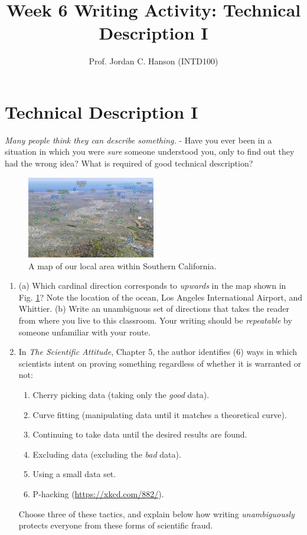\documentclass{article}
\begin{document}
\title{Week 6 Writing Activity: Technical Description I}
\author{Prof. Jordan C. Hanson (INTD100)}

\maketitle

\section{Technical Description I}

\textit{Many people think they can describe something.} - Have you ever been in a situation in which you were \textit{sure} someone understood you, only to find out they had the wrong idea?  What is required of good technical description?
\begin{figure}[ht]
\centering
\includegraphics[width=0.5\textwidth]{map.png}
\caption{\label{fig:1} A map of our local area within Southern California.}
\end{figure}

\begin{enumerate}
\item (a) Which cardinal direction corresponds to \textit{upwards} in the map shown in Fig. \ref{fig:1}?  Note the location of the ocean, Los Angeles International Airport, and Whittier. (b) Write an unambiguous set of directions that takes the reader from where you live to this classroom.  Your writing should be \textit{repeatable} by someone unfamiliar with your route. \\ \vspace{1cm}
\item In \textit{The Scientific Attitude}, Chapter 5, the author identifies (6) ways in which scientists intent on proving something regardless of whether it is warranted or not:
\begin{enumerate}
\small
\item Cherry picking data (taking only the \textit{good} data).
\item Curve fitting (manipulating data until it matches a theoretical curve).
\item Continuing to take data until the desired results are found.
\item Excluding data (excluding the \textit{bad} data).
\item Using a small data set.
\item P-hacking (\url{https://xkcd.com/882/}).
\end{enumerate}
Choose three of these tactics, and explain below how writing \textit{unambiguously} protects everyone from these forms of scientific fraud.
\end{enumerate}
\end{document}
